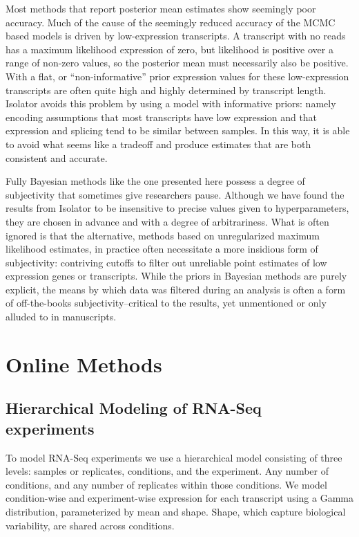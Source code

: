 \documentclass[twocolumn]{article}
\begin{document}
Most methods that report posterior mean estimates show seemingly poor accuracy.
Much of the cause of the seemingly reduced accuracy of the MCMC based models is
driven by low-expression transcripts. A transcript with no reads has a maximum
likelihood expression of zero, but likelihood is positive over a range of
non-zero values, so the posterior mean must necessarily also be positive. With
a flat, or ``non-informative'' prior expression values for these low-expression
transcripts are often quite high and highly determined by transcript length.
Isolator avoids this problem by using a model with informative priors: namely
encoding assumptions that most transcripts have low expression and that
expression and splicing tend to be similar between samples. In this way, it is
able to avoid what seems like a tradeoff and produce estimates that are both
consistent and
accurate.

Fully Bayesian methods like the one presented here possess a degree of
subjectivity that sometimes give researchers pause. Although we have
found the results from Isolator to be insensitive to precise values
given to hyperparameters, they are chosen in advance and with a degree
of arbitrariness. What is often ignored is that the alternative, methods
based on unregularized maximum likelihood estimates, in practice often
necessitate a more insidious form of subjectivity: contriving cutoffs to
filter out unreliable point estimates of low expression genes or
transcripts. While the priors in Bayesian methods are purely explicit,
the means by which data was filtered during an analysis is often a form
of off-the-books subjectivity--critical to the results, yet unmentioned
or only alluded to in manuscripts.

\section{Online Methods}\label{online-methods}

\subsection{Hierarchical Modeling of RNA-Seq
experiments}\label{hierarchical-modeling-of-rna-seq-experiments}

To model RNA-Seq experiments we use a hierarchical model consisting of
three levels: samples or replicates, conditions, and the experiment. Any
number of conditions, and any number of replicates within those
conditions. We model condition-wise and experiment-wise expression for
each transcript using a Gamma distribution, parameterized by mean and
shape. Shape, which capture biological variability, are shared across
conditions.
\end{document}
